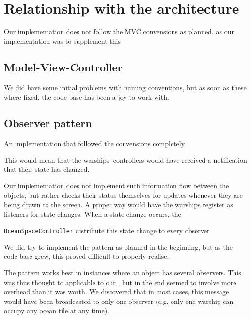 \chapter{Relationship with the architecture}
\label{cha:relationship_with_the_architecture}



Our implementation does not follow the MVC convensions as planned, as our implementation was to supplement this 


\section{Model-View-Controller}



We did have some initial problems with naming conventions, but as soon as these where fixed, the code base has been a joy to work with.



\section{Observer pattern}

An implementation that followed the convensions completely

This would mean that the warships' controllers would have received a notification that their state has changed.

Our implementation does not implement such information flow between the objects, but rather checks their status themselves for updates whenever they are being drawn to the screen.
A proper way would have the warships register as listeners for state changes. When a state change occurs, the 

\texttt{OceanSpaceController} distribute this state change to every observer

We did try to implement the pattern as planned in the beginning, but as the code base grew, this proved difficult to properly realise.

The pattern works best in instances where an object has several observers. This was thus thought to applicable to our 
, but in the end seemed to involve more overhead than it was worth. We discovered that in most cases, this message would have been broadcasted to only one observer (e.g. only one warship can occupy any ocean tile at any time).

